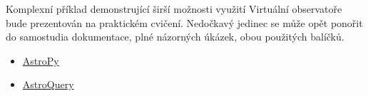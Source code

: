 \documentclass{report}
\providecommand{\tightlist}{%
      \setlength{\itemsep}{0pt}\setlength{\parskip}{0pt}}
\begin{document}
    Komplexní příklad demonstrující širší možnosti využití Virtuální
observatoře bude prezentován na praktickém cvičení. Nedočkavý jedinec se
může opět ponořit do samostudia dokumentace, plné názorných úkázek, obou
použitých balíčků.

\begin{itemize}
\tightlist
\item
  \href{http://docs.astropy.org/en/stable/}{AstroPy}
\item
  \href{http://astroquery.readthedocs.org/en/latest/}{AstroQuery}
\end{itemize}


    
    
    
    
\end{document}
